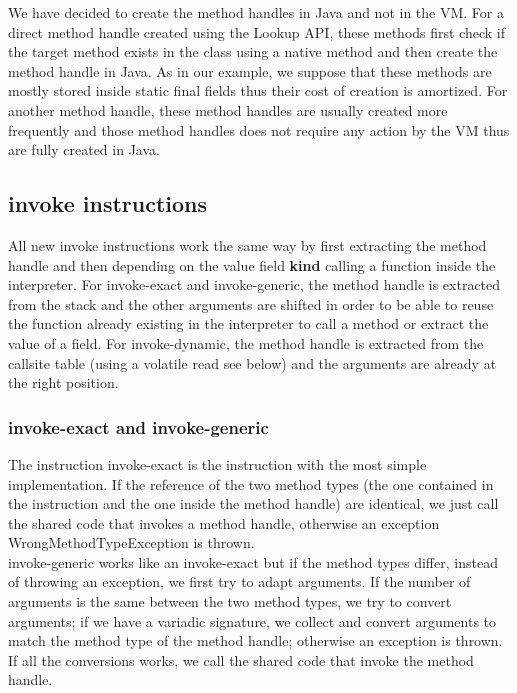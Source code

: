 \documentclass{sig-alternate}
\begin{document}
      We have decided to create the method handles in Java and not in the VM.
      For a direct method handle created using the Lookup API, these methods first check
      if the target method exists in the class using a native method and then create
      the method handle in Java. As in our example, we suppose that these methods are
      mostly stored inside static final fields thus their cost of creation is amortized.
      For another method handle, these method handles are usually created more frequently
      and those method handles does not require any action by the VM thus are fully created in Java.

    \subsection{invoke instructions}
      All new invoke instructions work the same way by first extracting the method handle
      and then depending on the value field {\bf kind} calling a function inside the interpreter.
      For invoke-exact and invoke-generic, the method handle is extracted from the stack and
      the other arguments are shifted in order to be able to reuse the function already existing in the interpreter
      to call a method or extract the value of a field.
      For invoke-dynamic, the method handle is extracted from the callsite table (using a volatile read see below)
      and the arguments are already at the right position.

    \subsubsection{invoke-exact and invoke-generic}
      The instruction invoke-exact is the instruction with the most simple implementation.
      If the reference of the two method types (the one contained in the instruction and the one inside the method handle)
      are identical, we just call the shared code that invokes a method handle,
      otherwise an exception WrongMethodTypeException is thrown.\\
      
      invoke-generic works like an invoke-exact but if the method types differ, instead of throwing an exception,
      we first try to adapt arguments.
      If the number of arguments is the same between the two method types, we try to convert arguments;
      if we have a variadic signature, we collect and convert arguments to match the method type of the method handle;
      otherwise an exception is thrown.
      If all the conversions works, we call the shared code that invoke the method handle.
  
\end{document}
